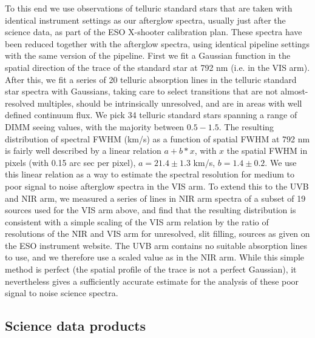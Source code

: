 \documentclass{aa}    %
\begin{document}
To this end we use observations of telluric standard stars that are taken with
identical instrument settings as our afterglow spectra, usually just after the
science data, as part of the ESO X-shooter calibration plan. These spectra have
been reduced together with the afterglow spectra, using identical pipeline
settings with the same version of the pipeline. First we fit a Gaussian function
in the spatial direction of the trace of the standard star at 792 nm (i.e. in
the VIS arm). After this, we fit a series of  20 telluric absorption lines in
the telluric standard star spectra with Gaussians, taking care to select
transitions that are not almost-resolved multiples, should be intrinsically
unresolved, and are in areas with well defined continuum flux. We pick 34
telluric standard stars spanning a range of DIMM seeing values, with the
majority between $0.5-1.5 $\arcsec. The resulting distribution of spectral FWHM
(km/s) as a function of spatial FWHM at 792 nm is fairly well described by a
linear relation $a + b*x$, with $x$ the spatial FWHM in pixels (with 0.15 arc
sec per pixel),  $a= 21.4 \pm 1.3$ km/s, $b=1.4 \pm 0.2$. We use this linear
relation as a way to estimate the spectral resolution for medium to poor signal
to noise afterglow spectra in the VIS arm. To extend this to the UVB and NIR
arm, we measured a series of lines in NIR arm spectra of a subset of 19 sources
used for the VIS arm above, and find that the resulting distribution is
consistent with a simple scaling of the VIS arm relation by the ratio of
resolutions of the NIR and VIS arm for unresolved, slit filling, sources as
given on the ESO instrument website. The UVB arm contains no suitable absorption
lines to use, and we therefore use a scaled value as in the NIR arm. While this
simple method is perfect (the spatial profile of the trace is not a perfect
Gaussian), it nevertheless gives a sufficiently accurate estimate for the
analysis of these poor signal to noise science spectra.


\subsection{Science data products} \label{products}

\end{document}
